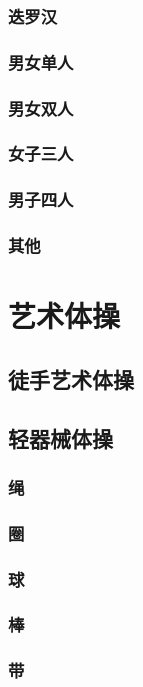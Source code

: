 \documentclass[UTF8]{../../ApplicationUniverse}
\begin{document}
    \subsubsection{迭罗汉}
    \subsubsection{男女单人}
    \subsubsection{男女双人}
    \subsubsection{女子三人}
    \subsubsection{男子四人}
    \subsubsection{其他}
\section{艺术体操}
    \subsection{徒手艺术体操}
    \subsection{轻器械体操}
        \subsubsection{绳}
        \subsubsection{圈}
        \subsubsection{球}
        \subsubsection{棒}
        \subsubsection{带}
\end{document}
